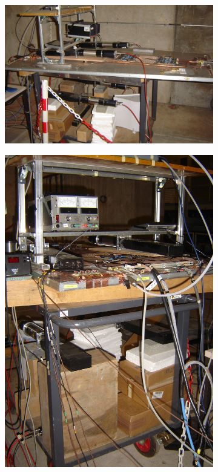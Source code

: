 	\begin{figure}[H]
		\begin{subfigure}{\linewidth}
		    \centering
			\includegraphics[width = 0.7\linewidth]{fig/chapt6/Setup-GIF-side.JPG}
			\caption{\label{fig:Setup-GIF:A}}
		\end{subfigure}
		\begin{subfigure}{0.5\linewidth}
		    \centering
			\includegraphics[width = 0.9\linewidth]{fig/chapt6/Setup-GIF-front.JPG}

\end{subfigure}
\end{figure}
